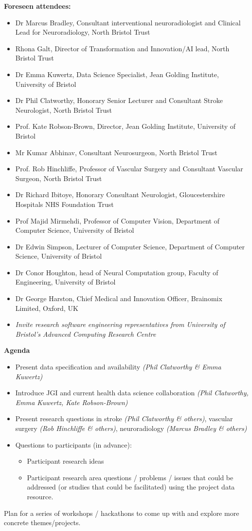 \documentclass{article}
\begin{document}
\textbf{Foreseen attendees:}
\begin{itemize}
\item Dr Marcus Bradley, Consultant interventional neuroradiologist
  and Clinical Lead for Neuroradiology, North Bristol Trust
\item Rhona Galt, Director of Transformation and Innovation/AI lead,
  North Bristol Trust
\item Dr Emma Kuwertz, Data Science Specialist, Jean Golding
  Institute, University of Bristol
\item Dr Phil Clatworthy, Honorary Senior Lecturer and
  Consultant Stroke Neurologist, North Bristol Trust
\item Prof. Kate Robson-Brown, Director, Jean Golding
  Institute, University of Bristol
\item Mr Kumar Abhinav, Consultant Neurosurgeon, North Bristol Trust
\item Prof. Rob Hinchliffe, Professor of Vascular Surgery and
  Consultant Vascular Surgeon, North Bristol Trust
\item Dr Richard Ibitoye, Honorary Consultant Neurologist,
  Gloucestershire Hospitals NHS Foundation Trust
\item Prof Majid Mirmehdi, Professor of Computer Vision, Department of
  Computer Science, University of Bristol
\item Dr Edwin Simpson, Lecturer of Computer Science, Department of
  Computer Science, University of Bristol
\item Dr Conor Houghton, head of Neural Computation group, Faculty
  of Engineering, University of Bristol
\item Dr George Harston, Chief Medical and Innovation Officer,
  Brainomix Limited, Oxford, UK
\item \textit{Invite research software engineering representatives from
    University of Bristol's Advanced Computing Research Centre}
\end{itemize}

\textbf{Agenda}
\begin{itemize}
\item    Present data specification and availability \textit{(Phil
    Clatworthy \& Emma Kuwertz)}
\item    Introduce JGI and current health data science collaboration \textit{(Phil
    Clatworthy, Emma Kuwertz, Kate Robson-Brown)}
\item    Present research questions in stroke \textit{(Phil
    Clatworthy \& others)}, vascular surgery \textit{(Rob Hinchliffe
    \& others)},
  neuroradiology \textit{(Marcus Bradley \& others)}
\item Questions to participants (in advance):
  \begin{itemize}
  \item Participant research ideas
  \item Participant research area questions / problems / issues that
    could be addressed (or studies that could be facilitated) using
    the project data resource.
  \end{itemize}
\end{itemize}
    Plan for a series of workshops / hackathons to come up with and explore more concrete themes/projects.
\end{document}
